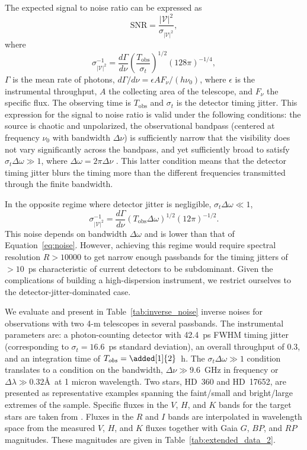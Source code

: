 \documentclass[linenumbers,trackchanges,margins]{aastex701}
\begin{document}
The expected signal to noise ratio can be expressed as
\begin{equation}
    \text{SNR} = \frac{|\mathcal{V}|^2}{\sigma_{|\mathcal{V}|^2}},
\end{equation}
where 
\begin{equation}
\sigma^{-1}_{|\mathcal{V}|^2} =\frac{d\Gamma}{d\nu}
\left(
\frac{T_{\text{obs}}}{\sigma_t}
\right)^{1/2} 
\left(128 \pi\right)^{-1/4}, \label{eq:noise}
\end{equation}
$\Gamma$ is the mean rate of photons, $d\Gamma/d\nu= \epsilon AF_\nu/(h\nu_0)$, where $\epsilon$ is the instrumental throughput,
$A$ the collecting area of the telescope, and $F_\nu$ the specific flux.  The observing time is $T_{\text{obs}}$ and $\sigma_t$
is the detector timing jitter.
This expression for the signal to noise ratio is valid under the following conditions: the source is chaotic and unpolarized, the observational bandpass (centered at frequency $\nu_0$ with bandwidth $\Delta \nu$) is sufficiently narrow that the visibility does not vary significantly across the bandpass, and yet sufficiently broad to satisfy $\sigma_t \Delta \omega \gg 1$, where $\Delta \omega = 2\pi\Delta\nu$
\citep{2024PhRvD.109l3029D}.
This latter condition means that the detector timing jitter blurs
the timing more than the different frequencies transmitted through the finite bandwidth.

In the opposite regime where detector jitter is negligible, $\sigma_t \Delta \omega \ll 1$, 
\begin{equation}
\sigma^{-1}_{|\mathcal{V}|^2} = \frac{d\Gamma}{d\nu} \left(T_{\text{obs}} \Delta \omega\right)^{1/2}  \left(12 \pi \right)^{-1/2}.
\end{equation}
This noise depends on bandwidth $\Delta \omega$ and is lower than that of Equation~\ref{eq:noise}. However, achieving this regime would require spectral resolution $R>10000$ to get narrow enough passbands for the timing jitters of $>10$~ps characteristic of current detectors to be subdominant.  Given the complications of building a high-dispersion instrument, we restrict ourselves to the detector-jitter-dominated case.

We evaluate and present in Table~\ref{tab:inverse_noise} inverse noises for observations with two
4-m telescopes in several passbands.
The instrumental parameters are: a photon-counting detector with 42.4~ps FWHM timing jitter
\cite{10.1117/1.JATIS.11.3.035005} (corresponding to $\sigma_t=16.6$~ps standard deviation),
an overall throughput of 0.3, and an integration time of $T_{obs}=\added[1]{2}$~h.
The $\sigma_t \Delta \omega \gg 1$ condition translates to a condition on the bandwidth,
$\Delta \nu \gg 9.6$~GHz in frequency or $\Delta \lambda \gg 0.32$\AA\ at 1 micron wavelength.
Two stars, HD~360 and HD~17652, are presented as representative examples spanning the faint/small and bright/large extremes of the sample. 
Specific fluxes in the $V$, $H$, and $K$ bands for the target stars are taken from \citet{2018A&A...616A..68G, 2019Natur.567..200P}. Fluxes in the $R$ and $I$ bands are interpolated in wavelength space from the measured $V$, $H$, and $K$ fluxes together with Gaia $G$, $BP$, and $RP$ magnitudes.  These magnitudes are given 
in Table~\ref{tab:extended_data_2}.
\end{document}
